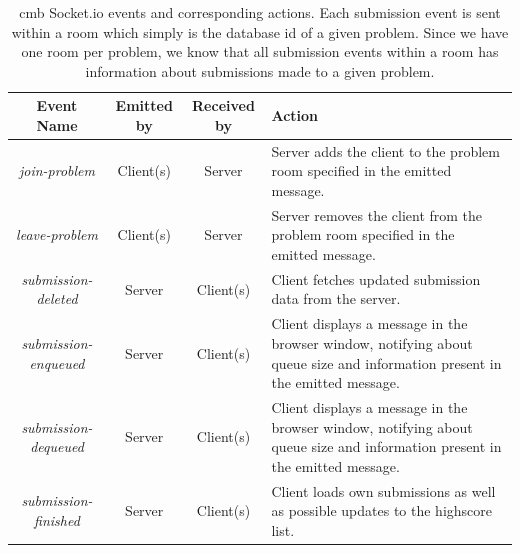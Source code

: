 \begin{table}[t!]
    \centering
    \begin{tabular}{ | c | c | c | p{4cm} | }
    \hline
    \textbf{Event Name} & \textbf{Emitted by} & \textbf{Received by} & \textbf{Action}\\
    \hline
    \textit{join-problem} & Client(s) & Server & Server adds the client to the problem room specified in the emitted message. \\ \hline
    \textit{leave-problem} & Client(s) & Server & Server removes the client from the problem room specified in the emitted message. \\ \hline
    \textit{submission-deleted} & Server & Client(s) & Client fetches updated submission data from the server. \\ \hline
    \textit{submission-enqueued} & Server & Client(s) & Client displays a message in the browser window, notifying about queue size and information present in the emitted message. \\ \hline
    \textit{submission-dequeued} & Server & Client(s) & Client displays a message in the browser window, notifying about queue size and information present in the emitted message. \\ \hline
    \textit{submission-finished} & Server & Client(s) & Client loads own submissions as well as possible updates to the highscore list. \\ \hline
    \end{tabular}
    \caption[\gls{cmb} Socket.io events and corresponding actions]{\gls{cmb} Socket.io events and corresponding actions. Each submission event is sent within a room which simply is the database id of a given problem. Since we have one room per problem, we know that all submission events within a room has information about submissions made to a given problem.}
    \label{tab:cmb-socketio-events}
\end{table}

